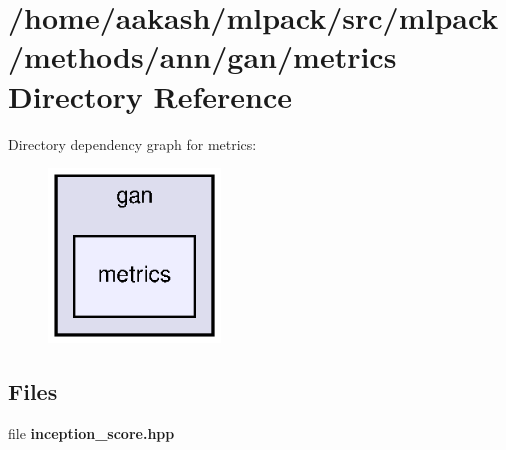 \section{/home/aakash/mlpack/src/mlpack/methods/ann/gan/metrics Directory Reference}
\label{dir_fad15b871161a97195139f0577b4ae8d}
Directory dependency graph for metrics\+:
\nopagebreak
\begin{figure}[H]
\begin{center}
\leavevmode
\includegraphics[width=130pt]{dir_fad15b871161a97195139f0577b4ae8d_dep}
\end{center}
\end{figure}
\subsection*{Files}
\begin{DoxyCompactItemize}
\item 
file \textbf{ inception\+\_\+score.\+hpp}
\end{DoxyCompactItemize}

